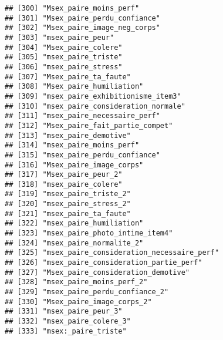 \documentclass[
]{article}
\begin{document}
\begin{verbatim}
## [300] "Msex_paire_moins_perf"                                             
## [301] "Msex_paire_perdu_confiance"                                        
## [302] "Msex_paire_image_neg_corps"                                        
## [303] "msex_paire_peur"                                                   
## [304] "Msex_paire_colere"                                                 
## [305] "msex_paire_triste"                                                 
## [306] "msex_paire_stress"                                                 
## [307] "Msex_paire_ta_faute"                                               
## [308] "Msex_paire_humiliation"                                            
## [309] "msex_paire_exhibitionisme_item3"                                   
## [310] "msex_paire_consideration_normale"                                  
## [311] "msex_paire_necessaire_perf"                                        
## [312] "Msex_paire_fait_partie_compet"                                     
## [313] "msex_paire_demotive"                                               
## [314] "msex_paire_moins_perf"                                             
## [315] "msex_paire_perdu_confiance"                                        
## [316] "Msex_paire_image_corps"                                            
## [317] "Msex_paire_peur_2"                                                 
## [318] "msex_paire_colere"                                                 
## [319] "msex_paire_triste_2"                                               
## [320] "msex_paire_stress_2"                                               
## [321] "msex_paire_ta_faute"                                               
## [322] "msex_paire_humiliation"                                            
## [323] "msex_paire_photo_intime_item4"                                     
## [324] "msex_paire_normalite_2"                                            
## [325] "msex_paire_consideration_necessaire_perf"                          
## [326] "msex_paire_consideration_partie_perf"                              
## [327] "Msex_paire_consideration_demotive"                                 
## [328] "msex_paire_moins_perf_2"                                           
## [329] "msex_paire_perdu_confiance_2"                                      
## [330] "Msex_paire_image_corps_2"                                          
## [331] "msex_paire_peur_3"                                                 
## [332] "msex_paire_colere_3"                                               
## [333] "msex:_paire_triste"                                                

\end{verbatim}
\end{document}
